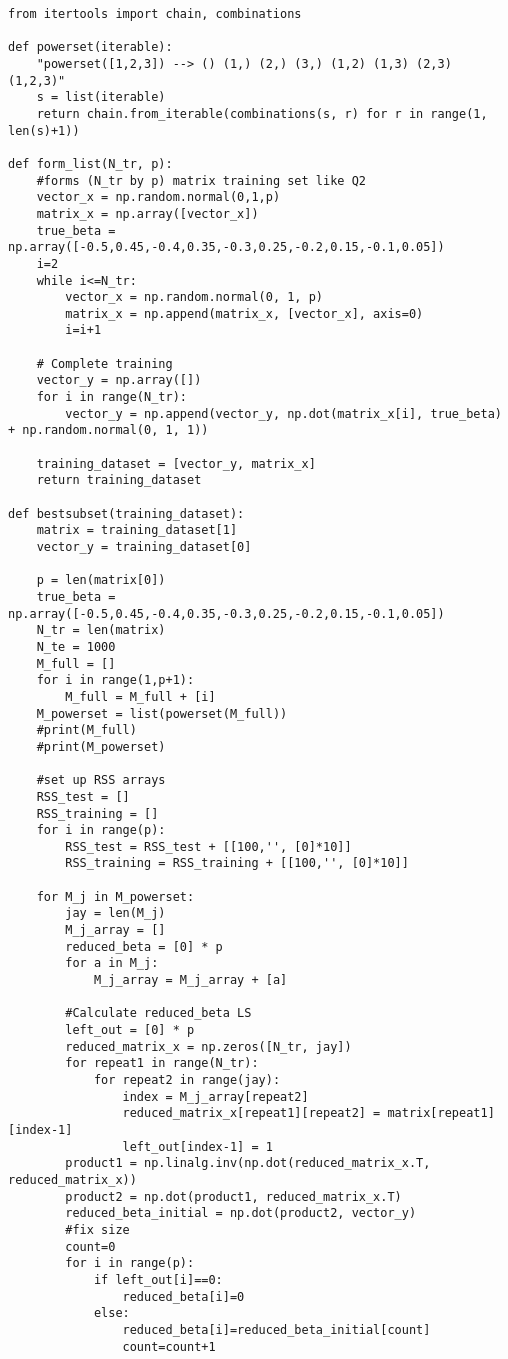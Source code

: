 \documentclass{article}
\begin{document}
\begin{lstlisting}
from itertools import chain, combinations

def powerset(iterable):
    "powerset([1,2,3]) --> () (1,) (2,) (3,) (1,2) (1,3) (2,3) (1,2,3)"
    s = list(iterable)
    return chain.from_iterable(combinations(s, r) for r in range(1, len(s)+1))

def form_list(N_tr, p):
    #forms (N_tr by p) matrix training set like Q2
    vector_x = np.random.normal(0,1,p)
    matrix_x = np.array([vector_x])
    true_beta = np.array([-0.5,0.45,-0.4,0.35,-0.3,0.25,-0.2,0.15,-0.1,0.05])
    i=2
    while i<=N_tr:
        vector_x = np.random.normal(0, 1, p)
        matrix_x = np.append(matrix_x, [vector_x], axis=0)
        i=i+1

    # Complete training
    vector_y = np.array([])
    for i in range(N_tr):
        vector_y = np.append(vector_y, np.dot(matrix_x[i], true_beta) + np.random.normal(0, 1, 1))

    training_dataset = [vector_y, matrix_x]
    return training_dataset

def bestsubset(training_dataset):
    matrix = training_dataset[1]
    vector_y = training_dataset[0]

    p = len(matrix[0])
    true_beta = np.array([-0.5,0.45,-0.4,0.35,-0.3,0.25,-0.2,0.15,-0.1,0.05])
    N_tr = len(matrix)
    N_te = 1000
    M_full = []
    for i in range(1,p+1):
        M_full = M_full + [i]
    M_powerset = list(powerset(M_full))
    #print(M_full)
    #print(M_powerset)

    #set up RSS arrays
    RSS_test = []
    RSS_training = []
    for i in range(p):
        RSS_test = RSS_test + [[100,'', [0]*10]]
        RSS_training = RSS_training + [[100,'', [0]*10]]

    for M_j in M_powerset:
        jay = len(M_j)
        M_j_array = []
        reduced_beta = [0] * p
        for a in M_j:
            M_j_array = M_j_array + [a]

        #Calculate reduced_beta LS
        left_out = [0] * p
        reduced_matrix_x = np.zeros([N_tr, jay])
        for repeat1 in range(N_tr):
            for repeat2 in range(jay):
                index = M_j_array[repeat2]
                reduced_matrix_x[repeat1][repeat2] = matrix[repeat1][index-1]
                left_out[index-1] = 1
        product1 = np.linalg.inv(np.dot(reduced_matrix_x.T, reduced_matrix_x))
        product2 = np.dot(product1, reduced_matrix_x.T)
        reduced_beta_initial = np.dot(product2, vector_y)
        #fix size
        count=0
        for i in range(p):
            if left_out[i]==0:
                reduced_beta[i]=0
            else:
                reduced_beta[i]=reduced_beta_initial[count]
                count=count+1


\end{lstlisting}
\end{document}
